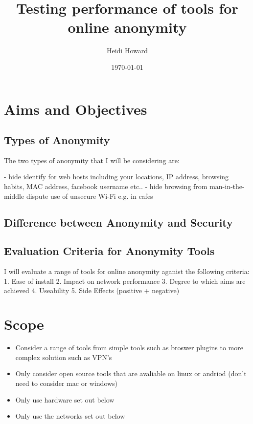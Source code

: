 \documentclass[12pt,a4paper,oneside]{article}
\begin{document}
\title{Testing performance of tools for online anonymity }
\author{Heidi Howard}
\date{\today}
\maketitle

\section{Aims and Objectives}

\subsection{Types of Anonymity}
The two types of anonymity that I will be considering are:

- hide identify for web hosts including your locations, IP address, browsing habits, MAC address, facebook username etc..
- hide browsing from man-in-the-middle dispute use of unsecure Wi-Fi e.g. in cafes 

\subsection{Difference between Anonymity and Security}

\subsection{Evaluation Criteria for Anonymity Tools}
I will evaluate a range of tools for online anonymity aganist the following criteria:
	1. Ease of install
	2. Impact on network performance
	3. Degree to which aims are achieved 
	4. Useability
	5. Side Effects (positive + negative)


\section{Scope}
\begin{itemize}
\item Consider a range of tools from simple tools such as broswer plugins to more complex solution such as VPN's
\item Only consider open source tools that are avaliable on linux or andriod (don't need to consider mac or windows)
\item Only use hardware set out below
\item Only use the networks set out below
\end{itemize}
\end{document}
